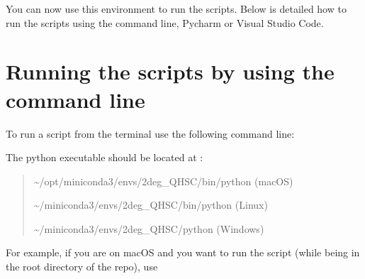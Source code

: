 \documentclass[letterpaper,10pt,english]{sphinxmanual}
\begin{document}
\begin{sphinxVerbatim}[commandchars=\\\{\}]
    
\end{sphinxVerbatim}

\sphinxAtStartPar
You can now use this environment to run the scripts.
Below is detailed how to run the scripts using the command line,
Pycharm or Visual Studio Code.


\section{Running the scripts by using the command line}
\label{\detokenize{usage:running-the-scripts-by-using-the-command-line}}
\sphinxAtStartPar
To run a script from the terminal use the following command line:

\begin{sphinxVerbatim}[commandchars=\\\{\}]
 
\end{sphinxVerbatim}

\sphinxAtStartPar
The python executable  should be located at :
\begin{quote}

\sphinxAtStartPar
\textasciitilde{}/opt/miniconda3/envs/2deg\_QH\sphinxhyphen{}SC/bin/python (macOS)

\sphinxAtStartPar
\textasciitilde{}/miniconda3/envs/2deg\_QH\sphinxhyphen{}SC/bin/python (Linux)

\sphinxAtStartPar
\textasciitilde{}/miniconda3/envs/2deg\_QH\sphinxhyphen{}SC/python (Windows)
\end{quote}

\sphinxAtStartPar
For example, if you are on macOS and you want to run the script
 (while being in the root directory of the repo), use

\begin{sphinxVerbatim}[commandchars=\\\{\}]
 
\end{sphinxVerbatim}
\end{document}
